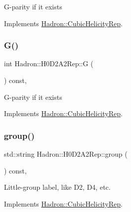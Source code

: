 G-\/parity if it exists 

Implements \mbox{\hyperlink{structHadron_1_1CubicHelicityRep_a50689f42be1e6170aa8cf6ad0597018b}{Hadron\+::\+Cubic\+Helicity\+Rep}}.

\mbox{\label{structHadron_1_1H0D2A2Rep_acee9edaa8107329ea6d26aa6384ca83f}} 
\subsubsection{\texorpdfstring{G()}{G()}\hspace{0.1cm}{\footnotesize\ttfamily [2/2]}}
{\footnotesize\ttfamily int Hadron\+::\+H0\+D2\+A2\+Rep\+::G (\begin{DoxyParamCaption}{ }\end{DoxyParamCaption}) const\hspace{0.3cm}{\ttfamily [inline]}, {\ttfamily [virtual]}}

G-\/parity if it exists 

Implements \mbox{\hyperlink{structHadron_1_1CubicHelicityRep_a50689f42be1e6170aa8cf6ad0597018b}{Hadron\+::\+Cubic\+Helicity\+Rep}}.

\mbox{\label{structHadron_1_1H0D2A2Rep_a447b40e4e175693969a3510643b01f46}} 
\subsubsection{\texorpdfstring{group()}{group()}\hspace{0.1cm}{\footnotesize\ttfamily [1/3]}}
{\footnotesize\ttfamily std\+::string Hadron\+::\+H0\+D2\+A2\+Rep\+::group (\begin{DoxyParamCaption}{ }\end{DoxyParamCaption}) const\hspace{0.3cm}{\ttfamily [inline]}, {\ttfamily [virtual]}}

Little-\/group label, like D2, D4, etc. 

Implements \mbox{\hyperlink{structHadron_1_1CubicHelicityRep_a101a7d76cd8ccdad0f272db44b766113}{Hadron\+::\+Cubic\+Helicity\+Rep}}.

\mbox{\label{structHadron_1_1H0D2A2Rep_a447b40e4e175693969a3510643b01f46}} 
